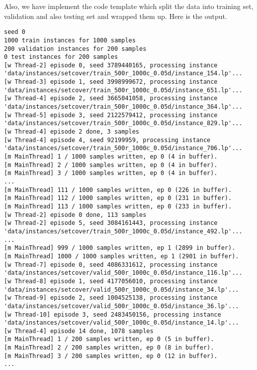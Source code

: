 Also, we have implement the code template which split the data into training set, validation and also testing set and wrapped them up.
Here is the output.
\begin{lstlisting}[style=DOS]
seed 0
1000 train instances for 1000 samples
200 validation instances for 200 samples
0 test instances for 200 samples
[w Thread-2] episode 0, seed 3789440165, processing instance 'data/instances/setcover/train_500r_1000c_0.05d/instance_154.lp'...
[w Thread-3] episode 1, seed 3998999672, processing instance 'data/instances/setcover/train_500r_1000c_0.05d/instance_651.lp'...
[w Thread-4] episode 2, seed 3665041058, processing instance 'data/instances/setcover/train_500r_1000c_0.05d/instance_364.lp'...
[w Thread-5] episode 3, seed 2122579412, processing instance 'data/instances/setcover/train_500r_1000c_0.05d/instance_829.lp'...
[w Thread-4] episode 2 done, 3 samples
[w Thread-4] episode 4, seed 92199959, processing instance 'data/instances/setcover/train_500r_1000c_0.05d/instance_706.lp'...
[m MainThread] 1 / 1000 samples written, ep 0 (4 in buffer).
[m MainThread] 2 / 1000 samples written, ep 0 (4 in buffer).
[m MainThread] 3 / 1000 samples written, ep 0 (4 in buffer).
...
[m MainThread] 111 / 1000 samples written, ep 0 (226 in buffer).
[m MainThread] 112 / 1000 samples written, ep 0 (231 in buffer).
[m MainThread] 113 / 1000 samples written, ep 0 (233 in buffer).
[w Thread-2] episode 0 done, 113 samples
[w Thread-2] episode 5, seed 3084161443, processing instance 'data/instances/setcover/train_500r_1000c_0.05d/instance_492.lp'...
...
[m MainThread] 999 / 1000 samples written, ep 1 (2899 in buffer).
[m MainThread] 1000 / 1000 samples written, ep 1 (2901 in buffer).
[w Thread-7] episode 0, seed 4086331612, processing instance 'data/instances/setcover/valid_500r_1000c_0.05d/instance_116.lp'...
[w Thread-8] episode 1, seed 4177056010, processing instance 'data/instances/setcover/valid_500r_1000c_0.05d/instance_34.lp'...
[w Thread-9] episode 2, seed 1004525138, processing instance 'data/instances/setcover/valid_500r_1000c_0.05d/instance_36.lp'...
[w Thread-10] episode 3, seed 2483450156, processing instance 'data/instances/setcover/valid_500r_1000c_0.05d/instance_14.lp'...
[w Thread-4] episode 14 done, 1078 samples
[m MainThread] 1 / 200 samples written, ep 0 (5 in buffer).
[m MainThread] 2 / 200 samples written, ep 0 (8 in buffer).
[m MainThread] 3 / 200 samples written, ep 0 (12 in buffer).
...
\end{lstlisting}